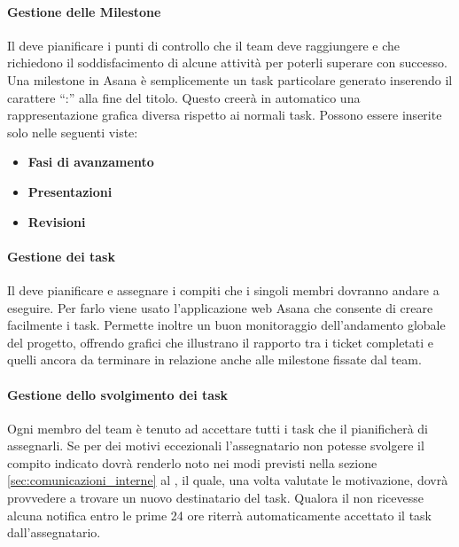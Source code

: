 			\paragraph{Gestione delle Milestone} %
			\label{par:gestione_delle_milestone}
			Il \roleProjectManager{} deve pianificare i punti di controllo che il team deve raggiungere e che richiedono il soddisfacimento di alcune attività per poterli superare con successo. \newline
			Una milestone in Asana è semplicemente un task particolare generato inserendo il carattere ``:'' alla fine del titolo. Questo creerà in automatico una rappresentazione grafica diversa rispetto ai normali task. \newline
			Possono essere inserite solo nelle seguenti viste:
				\begin{itemize}
					\item \textbf{Fasi di avanzamento}
					\item \textbf{Presentazioni}
					\item \textbf{Revisioni}
				\end{itemize}
			
			\paragraph{Gestione dei task}
			\label{sec:gestione_dei_task}
			Il \roleProjectManager{} deve pianificare e assegnare i compiti che i singoli membri dovranno andare a eseguire. Per farlo viene usato l'applicazione web Asana che consente di creare facilmente i task. \newline
			Permette inoltre un buon monitoraggio dell'andamento globale del progetto, offrendo grafici che illustrano il rapporto tra i ticket completati e quelli ancora da terminare in relazione anche alle milestone fissate dal team.

			\paragraph{Gestione dello svolgimento dei task} %
			\label{par:gestione_dello_svolgimento_dei_task}
			Ogni membro del team è tenuto ad accettare tutti i task che il \roleProjectManager{} pianificherà di assegnarli. \newline
			Se per dei motivi eccezionali l'assegnatario non potesse svolgere il compito indicato dovrà renderlo noto nei modi previsti nella sezione \ref{sec:comunicazioni_interne} al \roleProjectManager, il quale, una volta valutate le motivazione, dovrà provvedere a trovare un nuovo destinatario del task. \newline
			Qualora il \roleProjectManager{} non ricevesse alcuna notifica entro le prime 24 ore riterrà automaticamente accettato il task dall'assegnatario.

